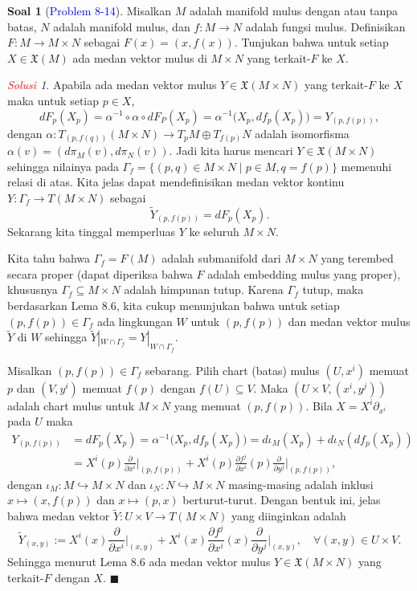 \documentclass[11pt]{article}
\theoremstyle{definition}
\newtheorem*{problem}{Soal}
\theoremstyle{remark}
\newtheorem*{solution}{\textcolor{red}{Solusi}}
\newcommand{\ddxi}{\frac{\partial}{\partial x^i}}
\newcommand{\ddyj}{\frac{\partial}{\partial y^j}}
\begin{document}
\begin{problem}[\textcolor{blue}{Problem 8-14}]
Misalkan $M$ adalah manifold mulus dengan atau tanpa batas, $N$ adalah manifold mulus, dan $f : M \to N$ adalah fungsi mulus. Definisikan $F : M \to M \times N$ sebagai $F(x) = (x,f(x))$. Tunjukan bahwa untuk setiap $X \in \mathfrak{X}(M)$ ada medan vektor mulus di $M \times N$ yang terkait-$F$ ke $X$.
\end{problem}
\begin{solution}
Apabila ada medan vektor mulus $Y \in \mathfrak{X}(M \times N)$ yang terkait-$F$ ke $X$ maka untuk setiap $p \in X$, 
$$
dF_p(X_p) = \alpha^{-1} \circ \alpha \circ dF_P(X_p) = \alpha^{-1}\big( X_p, df_p(X_p) \big) = Y_{(p,f(p))}, 
$$
dengan $\alpha : T_{(p,f(q))}(M \times N) \to T_pM \oplus T_{f(p)}N$ adalah isomorfisma $\alpha(v) = (d\pi_M(v),d\pi_N(v))$. Jadi kita harus mencari $Y \in \mathfrak{X}(M \times N)$ sehingga nilainya pada $\Gamma_f = \{(p,q) \in M \times N \mid p \in M , q=f(p)\}$ memenuhi relasi di atas. Kita jelas dapat mendefinisikan medan vektor kontinu $Y : \Gamma_f \to T(M \times N)$ sebagai
$$
\widetilde{Y}_{(p,f(p))} = dF_p(X_p).
$$
Sekarang kita tinggal memperluas $Y$ ke seluruh $M \times N$. 

Kita tahu bahwa $\Gamma_f=F(M)$ adalah submanifold dari $M \times N$ yang terembed secara proper (dapat diperiksa bahwa $F$ adalah embedding mulus yang proper), khususnya $\Gamma_f \subseteq M \times N$ adalah himpunan tutup. Karena $\Gamma_f$ tutup, maka berdasarkan Lema 8.6, kita cukup menunjukan bahwa untuk setiap $(p,f(p)) \in \Gamma_f$ ada lingkungan $W$ untuk $(p,f(p))$ dan medan vektor mulus $\widetilde{Y}$ di $W$ sehingga $\widetilde{Y}|_{W \cap \Gamma_f} = Y|_{W \cap \Gamma_f}$. 

Misalkan $(p,f(p)) \in \Gamma_f$ sebarang. Pilih chart (batas) mulus $(U,x^i)$ memuat $p$ dan $(V,y^i)$ memuat $f(p)$ dengan $f(U) \subseteq V$. Maka $(U \times V, (x^i,y^j))$ adalah chart mulus untuk $M \times N$ yang memuat $(p,f(p))$. Bila $X = X^i \partial_{x^i}$ pada $U$ maka
\begin{align*}
    Y_{(p,f(p))} &= dF_p(X_p) = \alpha^{-1} \big( X_p,df_p(X_p) \big) = d\iota_M(X_p) + d\iota_N(df_p(X_p)) \\ &= X^i(p) \ddxi\Big|_{(p,f(p))} + X^i(p) \frac{\partial f^j}{\partial x^i}(p) \ddyj\Big|_{(p,f(p))},
\end{align*}
dengan $\iota_M : M \hookrightarrow M \times N$ dan $\iota_N : N \hookrightarrow M \times N$ masing-masing adalah inklusi $x \mapsto (x,f(p))$ dan $x \mapsto (p,x)$ berturut-turut. Dengan bentuk ini, jelas bahwa medan vektor $\widetilde{Y} : U \times V \to T(M \times N)$ yang diinginkan adalah 
$$
\widetilde{Y}_{(x,y)}:= X^i(x) \ddxi\Big|_{(x,y)} + X^i(x) \frac{\partial f^j}{\partial x^i}(x) \ddyj\Big|_{(x,y)}, \quad \forall (x,y)\in U \times V.
$$
Sehingga menurut Lema 8.6 ada medan vektor mulus $Y \in \mathfrak{X}(M \times N)$ yang terkait-$F$ dengan $X$. $\blacksquare$
\end{solution}
\end{document}

